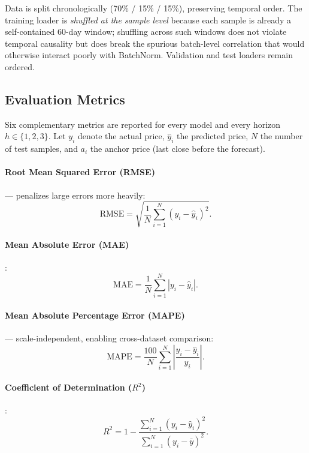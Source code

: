 \documentclass[12pt]{article}
\begin{document}
Data is split chronologically (70\% / 15\% / 15\%), preserving temporal order. The training loader is \emph{shuffled at the sample level} because each sample is already a self-contained 60-day window; shuffling across such windows does not violate temporal causality but does break the spurious batch-level correlation that would otherwise interact poorly with BatchNorm. Validation and test loaders remain ordered.

\subsection{Evaluation Metrics}
\label{sec:metrics}

Six complementary metrics are reported for every model and every horizon $h\in\{1,2,3\}$. Let $y_i$ denote the actual price, $\hat{y}_i$ the predicted price, $N$ the number of test samples, and $a_i$ the anchor price (last close before the forecast).

\paragraph{Root Mean Squared Error (RMSE)} --- penalizes large errors more heavily:
\begin{equation}
    \mathrm{RMSE} = \sqrt{\frac{1}{N}\sum_{i=1}^{N}\left(y_i - \hat{y}_i\right)^2}.
\label{eq:rmse}
\end{equation}

\paragraph{Mean Absolute Error (MAE)}:
\begin{equation}
    \mathrm{MAE} = \frac{1}{N}\sum_{i=1}^{N}\left|y_i - \hat{y}_i\right|.
\label{eq:mae}
\end{equation}

\paragraph{Mean Absolute Percentage Error (MAPE)} --- scale-independent, enabling cross-dataset comparison:
\begin{equation}
    \mathrm{MAPE} = \frac{100}{N}\sum_{i=1}^{N}\left|\frac{y_i - \hat{y}_i}{y_i}\right|.
\label{eq:mape}
\end{equation}

\paragraph{Coefficient of Determination ($R^2$)}:
\begin{equation}
    R^2 = 1 - \frac{\sum_{i=1}^{N}\left(y_i - \hat{y}_i\right)^2}{\sum_{i=1}^{N}\left(y_i - \bar{y}\right)^2}.
\label{eq:r2}
\end{equation}
\end{document}
